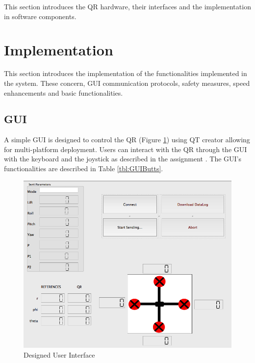 \documentclass{article}
\begin{document}
This section introduces the QR hardware, their interfaces and the implementation in software components. 



\section{Implementation}
\label{sec:implementation}

This section introduces the implementation of the functionalities implemented in the system. These concern, GUI communication protocols, safety measures, speed enhancements and basic functionalities.


\subsection{GUI}
A simple GUI is designed to control the QR (Figure \ref{fig.GUI}) using QT creator allowing for multi-platform deployment. Users can interact with the QR through the GUI with the keyboard and the joystick as described in the assignment \cite{langendoen2014assignment}. The GUI's functionalities are described in Table \ref{tbl:GUIButts}. 

\begin{figure}[ht]
\centering
	\includegraphics[scale=0.35]{Figures/GUI.png}
	\caption{Designed User Interface}
	\label{fig.GUI}
\end{figure}
\end{document}
